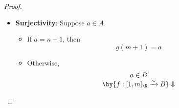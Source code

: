 \begin{proof}
\begin{itemize}
\begin{itemize}
\begin{itemize}
\begin{itemize}
\[\begin{array}{c}
                                      k_{2} = m + 1
                                    \end{array}
                                  \]
                            \item Otherwise,
                                  \[
                                    \begin{array}{c}
                                      k_{1} \in [1, m]_{\N}                                            \\
                                      \Downarrow                                                       \\
                                      g(k_{1}) = f(k_{1})                                              \\
                                      \Downarrow                                                       \\
                                      g(k_{2}) = f(k_{1})                                              \\
                                      \by{\ensuremath{f(k_{1}) \neq n + 1}} \Downarrow                 \\
                                      g(k_{2}) = f(k_{2}) = f(k_{1})                                   \\
                                      \by{\ensuremath{f: [1, m]_{\N} \xrightarrow{\sim} B}} \Downarrow \\
                                      k_{1} = k_{2}
                                    \end{array}
                                  \]
                          \end{itemize}
                    \item \textbf{Surjectivity}: Suppose $a \in A$.
                          \begin{itemize}
                            \item If $a = n + 1$, then
                                  \[
                                    g(m + 1) = a
                                  \]
                            \item Otherwise,
                                  \[
                                    \begin{array}{c}
                                      a \in B                                                          \\
                                      \by{\ensuremath{f: [1, m]_{\N} \xrightarrow{\sim} B}} \Downarrow \\

\end{array}\]
\end{itemize}
\end{itemize}
\end{itemize}
\end{itemize}
\end{proof}
